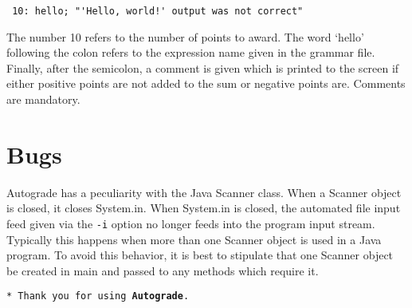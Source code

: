 \documentclass{article}
\begin{document}
\begin{verbatim}
 10: hello; "'Hello, world!' output was not correct"
\end{verbatim}

The number 10 refers to the number of points to award.  The word `hello'
following the colon refers to the expression name given in the grammar file.
Finally, after the semicolon, a comment is given which is printed to the screen
if either positive points are not added to the sum or negative points are.
Comments are mandatory.

\section{Bugs}

Autograde has a peculiarity with the Java Scanner class.  When a Scanner
object is closed, it closes System.in.  When System.in is closed, the automated
file input feed given via the \texttt{-i} option no longer feeds into the
program input stream. Typically this happens when more than one Scanner object
is used in a Java program.  To avoid this behavior, it is best to stipulate
that one Scanner object be created in main and passed to any methods which
require it.

\texttt{* Thank you for using \textbf{Autograde}.}
\end{document}
